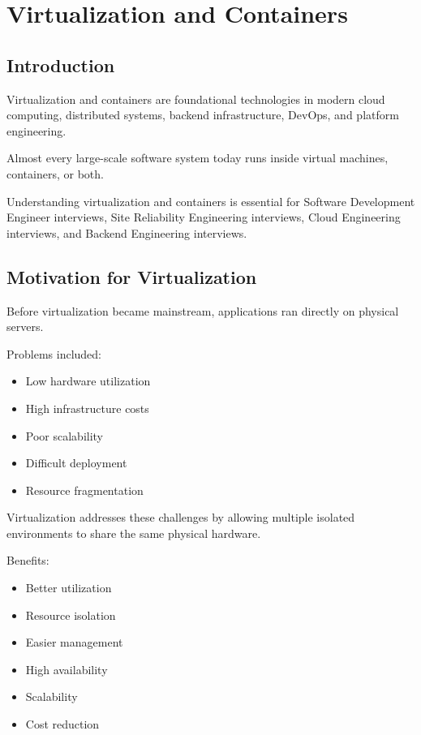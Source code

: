 \chapter{Virtualization and Containers}

\section{Introduction}

Virtualization and containers are foundational technologies in modern cloud computing, distributed systems, backend infrastructure, DevOps, and platform engineering.

Almost every large-scale software system today runs inside virtual machines, containers, or both.

Understanding virtualization and containers is essential for Software Development Engineer interviews, Site Reliability Engineering interviews, Cloud Engineering interviews, and Backend Engineering interviews.

\section{Motivation for Virtualization}

Before virtualization became mainstream, applications ran directly on physical servers.

Problems included:

\begin{itemize}
\item Low hardware utilization
\item High infrastructure costs
\item Poor scalability
\item Difficult deployment
\item Resource fragmentation
\end{itemize}

Virtualization addresses these challenges by allowing multiple isolated environments to share the same physical hardware.

Benefits:

\begin{itemize}
\item Better utilization
\item Resource isolation
\item Easier management
\item High availability
\item Scalability
\item Cost reduction
\end{itemize}

